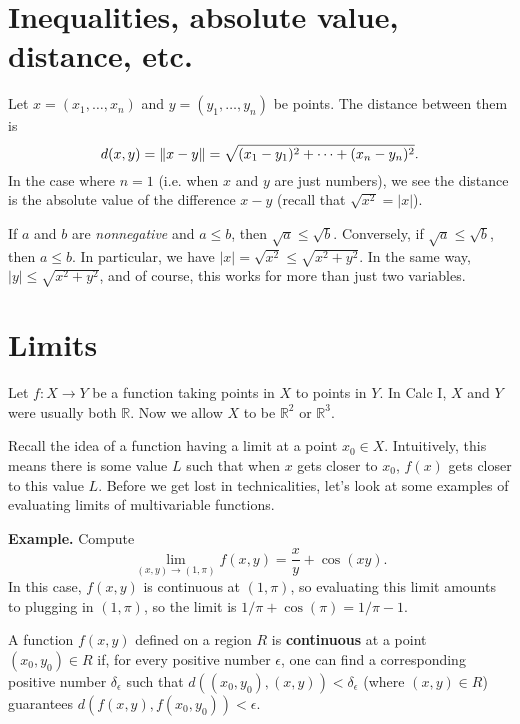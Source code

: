 \documentclass{article}
\begin{document}


\section*{Inequalities, absolute value, distance, etc.}
Let $x=(x_1,\ldots,x_n)$ and $y=(y_1,\ldots,y_n)$ be points. The distance
between them is 
\[ d(x,y)=\norm{x-y}= \sqrt{(x_1-y_1)^2+\cdots+(x_n-y_n)^2} .\]
In the case where $n=1$ (i.e. when $x$ and $y$ are just numbers), we see
the distance is the absolute value of the difference $x-y$ (recall that $\sqrt{x^2}=|x|$).

If $a$ and $b$ are \emph{nonnegative} and $a\leq b$, then 
$\sqrt{a} \leq \sqrt{b}$. Conversely, if $\sqrt{a} \leq \sqrt{b}$, then $a\leq b$. In particular,
we have $|x|=\sqrt{x^2} \leq \sqrt{x^2 + y^2}$. In the same way, $|y| \leq \sqrt{x^2+y^2}$, and of course,
this works for more than just two variables.

\section*{Limits}
Let $f: X \to Y$ be a function taking points in $X$ to points in $Y$. In Calc I, $X$ and $Y$ were usually both $\mathbb{R}$. Now we allow $X$ to be $\mathbb{R}^2$ or $\mathbb{R}^3$.  

Recall the idea of a function having a limit at a point $x_0 \in X$. Intuitively, this means there is
some value $L$ such that when $x$ gets closer to $x_0$, $f(x)$ gets closer to this value $L$. Before we get lost 
in technicalities, let's look at some examples of evaluating limits of multivariable functions. 

\textbf{Example.} Compute 
\[\lim_{(x,y) \to (1,\pi)} f(x,y) = \frac{x}{y} + \cos(xy).\]
In this case, $f(x,y)$ is continuous at $(1,\pi)$, so evaluating this limit amounts to plugging in
$(1,\pi)$, so the limit is $1/\pi + \cos(\pi) = 1/\pi -1$.

\begin{definition}
    A function $f(x,y)$ defined on a region $R$ is \textbf{continuous} at a point $(x_0,y_0) \in R$ if, 
    for every positive number $\epsilon$,  one can find a corresponding positive number $\delta_\epsilon$ such that
    $d((x_0,y_0),(x,y)) < \delta_\epsilon$ (where $(x,y) \in R$) guarantees $d(f(x,y),f(x_0,y_0)) < \epsilon$. 
\end{definition}
\end{document}

